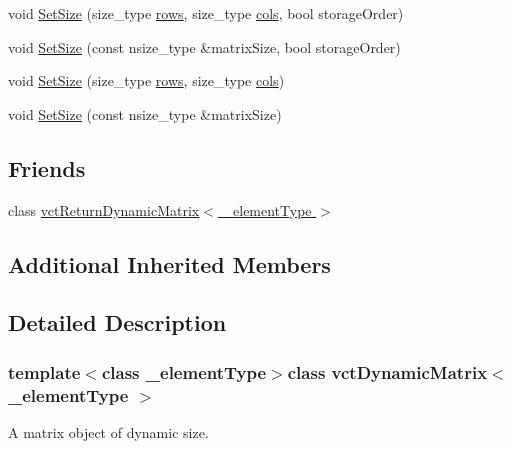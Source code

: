 {\bf }\par
\begin{DoxyCompactItemize}
\item 
void \hyperlink{classvct_dynamic_matrix_a4ff773e41fa6605e6e2527822b1ae662}{Set\+Size} (size\+\_\+type \hyperlink{classvct_dynamic_const_matrix_base_a5eac13be2207ebeb8766cde379d73438}{rows}, size\+\_\+type \hyperlink{classvct_dynamic_const_matrix_base_aa6c51d41a100da49a7e7ac7edb20ecd9}{cols}, bool storage\+Order)
\item 
void \hyperlink{classvct_dynamic_matrix_a909f2ba6b179b8598897a65a4bb5f369}{Set\+Size} (const nsize\+\_\+type \&matrix\+Size, bool storage\+Order)
\item 
void \hyperlink{classvct_dynamic_matrix_a080da305b92644732f33a9b964ef1ae1}{Set\+Size} (size\+\_\+type \hyperlink{classvct_dynamic_const_matrix_base_a5eac13be2207ebeb8766cde379d73438}{rows}, size\+\_\+type \hyperlink{classvct_dynamic_const_matrix_base_aa6c51d41a100da49a7e7ac7edb20ecd9}{cols})
\item 
void \hyperlink{classvct_dynamic_matrix_a9ab88fbeda43ed51e06e871006f255fd}{Set\+Size} (const nsize\+\_\+type \&matrix\+Size)
\end{DoxyCompactItemize}

\subsection*{Friends}
\begin{DoxyCompactItemize}
\item 
class \hyperlink{classvct_dynamic_matrix_a15520a0716ed8e67f2cba2a95cbe51a7}{vct\+Return\+Dynamic\+Matrix$<$ \+\_\+element\+Type $>$}
\end{DoxyCompactItemize}
\subsection*{Additional Inherited Members}


\subsection{Detailed Description}
\subsubsection*{template$<$class \+\_\+element\+Type$>$class vct\+Dynamic\+Matrix$<$ \+\_\+element\+Type $>$}

A matrix object of dynamic size. 


